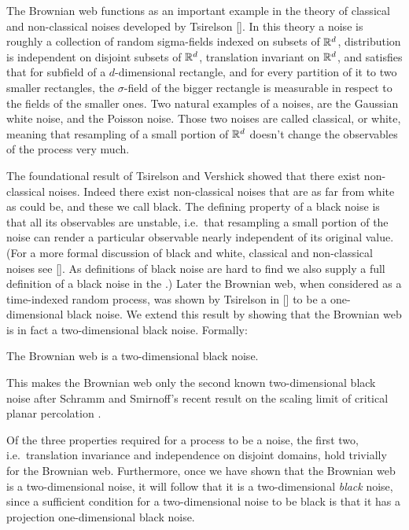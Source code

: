 {The Brownian web functions as an important example in the theory of classical
and non-classical noises developed by Tsirelson []. In this theory a noise is
roughly a collection of random sigma-fields indexed on subsets of $\mathbb{R}^d$,
distribution is independent on disjoint subsets of $\mathbb{R}^d$, translation
invariant on $\mathbb{R}^d$, and satisfies that for subfield of a $d$-dimensional
rectangle, and for every partition of it to two smaller rectangles, the $\sigma$-field
of the bigger rectangle is measurable in respect to the fields of the
smaller ones. Two natural examples of a noises, are the Gaussian white noise,
and the Poisson noise. Those two noises are called classical, or white,
meaning that
resampling of a small portion of $\mathbb{R}^d$ doesn't change the observables of the
process very much.

The foundational result of Tsirelson and Vershick showed that there
exist non-classical noises.  Indeed there exist non-classical noises
that are as far from white as could be, and these we call black.  The
defining property of a black noise is that all its observables are
unstable, i.e.\ that resampling a small portion of the noise can
render a particular observable nearly independent of its original
value.  (For a more formal discussion of black and white, classical
and non-classical noises see [].  As definitions of black noise are
hard to find we also supply a full definition of a black noise in
the .)  Later the Brownian web,
when considered as a time-indexed random process,
was shown by Tsirelson in [] to be a one-dimensional black noise.  We
extend this
result by showing that the Brownian web is in fact a two-dimensional
black noise.  Formally:

\begin{theorem}
\label{thm:bw-2d-black-noise}
The Brownian web is a
two-dimensional black noise.
\end{theorem}

This makes the Brownian web only the second
known two-dimensional black noise after Schramm and Smirnoff's
recent result on the scaling limit of critical planar
percolation .

Of the three properties required for a process to be a noise, the
first two, i.e.\ translation invariance and independence on disjoint
domains, hold trivially for the Brownian web.  Furthermore, once we
have shown that the Brownian web is a two-dimensional noise, it will
follow that it is a two-dimensional \emph{black} noise, since a
sufficient condition for a two-dimensional noise to be black is that
it has a projection one-dimensional black noise.




}
